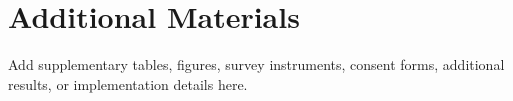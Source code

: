 \chapter{Additional Materials}
\label{app:additional-materials}

Add supplementary tables, figures, survey instruments, consent forms, additional results, or implementation details here.
